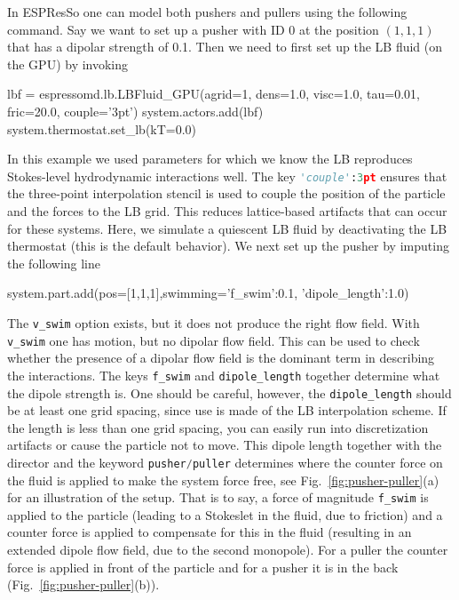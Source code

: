 \documentclass[aip,jcp,reprint,a4paper,onecolumn,amsmath]{revtex4-1}
\newcommand{\es}{\mbox{\textsf{ESPResSo}}\xspace}
\newcommand\codees{\lstinline[language=python]}
\begin{document}
In \es{} one can model both pushers and pullers using the following command. Say we want to set up a pusher with ID 0 at the position $(1,1,1)$ that has a dipolar strength of 0.1. Then we need to first set up the LB fluid (on the GPU) by invoking
\begin{espresso}
lbf = espressomd.lb.LBFluid_GPU(agrid=1, dens=1.0, visc=1.0, tau=0.01, fric=20.0, couple='3pt')
system.actors.add(lbf)
system.thermostat.set_lb(kT=0.0)
\end{espresso}
In this example we used parameters for which we know the LB reproduces Stokes-level hydrodynamic interactions well. The key \codees{'couple':3pt} ensures that the three-point interpolation stencil is used to couple the position of the particle and the forces to the LB grid. This reduces lattice-based artifacts that can occur for these systems. Here, we simulate a quiescent LB fluid by deactivating the LB thermostat (this is the default behavior). We next set up the pusher by imputing the following line
\begin{espresso}
system.part.add(pos=[1,1,1],swimming={'f_swim':0.1, 'dipole_length':1.0})
\end{espresso}
The \codees{v_swim} option exists, but it does not produce the right flow field. With \codees{v_swim} one has motion, but no dipolar flow field. This can be used to check whether the presence of a dipolar flow field is the dominant term in describing the interactions. The keys \codees{f_swim} and \codees{dipole_length} together determine what the dipole strength is. One should be careful, however, the \codees{dipole_length} should be at least one grid spacing, since use is made of the LB interpolation scheme. If the length is less than one grid spacing, you can easily run into discretization artifacts or cause the particle not to move. This dipole length together with the director and the keyword \codees{pusher/puller} determines where the counter force on the fluid is applied to make the system force free, see Fig.~\ref{fig:pusher-puller}(a) for an illustration of the setup. That is to say, a force of magnitude \codees{f_swim} is applied to the particle (leading to a Stokeslet in the fluid, due to friction) and a counter force is applied to compensate for this in the fluid (resulting in an extended dipole flow field, due to the second monopole). For a puller the counter force is applied in front of the particle and for a pusher it is in the back (Fig.~\ref{fig:pusher-puller}(b)).
\end{document}
